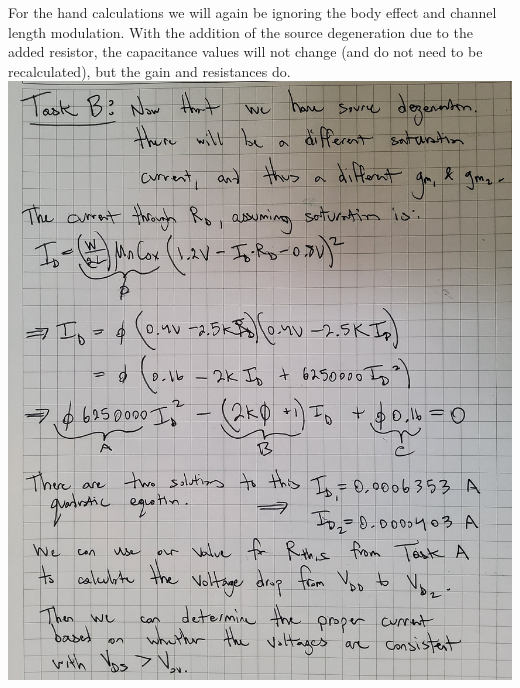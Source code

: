 \documentclass[12pt, fleqn]{article}
\begin{document}
For the hand calculations we will again be ignoring the body effect and channel length modulation.  With the addition of the source degeneration due to the added resistor, the capacitance values will not change (and do not need to be recalculated), but the gain and resistances do.\\[0.25cm]
\includegraphics[scale=0.15, angle=90, center]{p1_7.jpg}\\
\newpage
\end{document}
